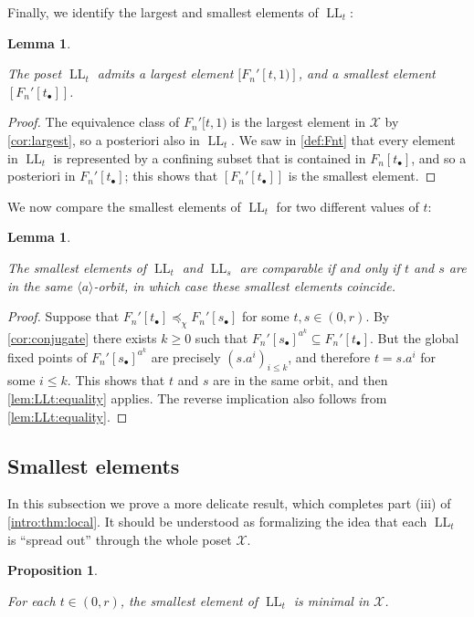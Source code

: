\documentclass[reqno,12pt]{amsart}\setcounter{tocdepth}{1}
\newtheorem{lemma}[theorem]{Lemma}
\newtheorem{proposition}[theorem]{Proposition}
\theoremstyle{definition}
\DeclareMathOperator{\LL}{LL}
\newcommand{\X}{\mathcal{X}}
\numberwithin{equation}{section}
\begin{document}
Finally, we identify the largest and smallest elements of $\LL_t$:

\begin{lemma}
\label{lem:LLt:largestsmallest}

The poset $\LL_t$ admits a largest element $[F_n'[t, 1)]$, and a smallest element $[F_n'[t_\bullet]]$.
\end{lemma}

\begin{proof}
The equivalence class of $F_n'[t, 1)$ is the largest element in $\X$ by \cref{cor:largest}, so a posteriori also in $\LL_t$. We saw in \cref{def:Fnt} that every element in $\LL_t$ is represented by a confining subset that is contained in $F_n[t_\bullet]$, and so a posteriori in $F_n'[t_\bullet]$; this shows that $[F_n'[t_\bullet]]$ is the smallest element.
\end{proof}

We now compare the smallest elements of $\LL_t$ for two different values of $t$:

\begin{lemma}
\label{lem:LLt:smallest:compare}

The smallest elements of $\LL_t$ and $\LL_s$ are comparable if and only if $t$ and $s$ are in the same $\langle a\rangle$-orbit, in which case these smallest elements coincide.
\end{lemma}

\begin{proof}
Suppose that $F_n'[t_\bullet] \preceq_\chi F_n'[s_\bullet]$ for some $t, s \in (0, r)$. By \cref{cor:conjugate} there exists $k \geq 0$ such that $F_n'[s_\bullet]^{a^k} \subseteq F_n'[t_\bullet]$. But the global fixed points of $F_n'[s_\bullet]^{a^k}$ are precisely $(s.a^i)_{i \leq k}$, and therefore $t = s.a^i$ for some $i \leq k$. This shows that $t$ and $s$ are in the same orbit, and then \cref{lem:LLt:equality} applies. The reverse implication also follows from \cref{lem:LLt:equality}. 
\end{proof}


\subsection{Smallest elements}

In this subsection we prove a more delicate result, which completes part (iii) of \cref{intro:thm:local}. It should be understood as formalizing the idea that each $\LL_t$ is ``spread out'' through the whole poset $\X$.

\begin{proposition}
\label{prop:LLt:minimal}

For each $t\in (0,r)$, the smallest element of $\LL_t$ is minimal in $\X$.
\end{proposition}
\end{document}
